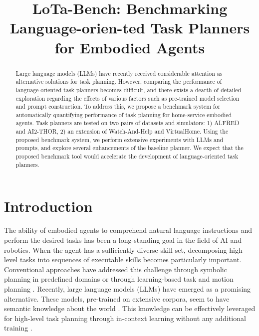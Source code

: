 \title{LoTa-Bench: Benchmarking Language-orien-ted Task Planners for Embodied Agents}



\maketitle
\def\thefootnote{*}\def\thefootnote{\arabic{footnote}}

\begin{abstract}
Large language models (LLMs) have recently received considerable attention as alternative solutions for task planning. However, comparing the performance of language-oriented task planners becomes difficult, and there exists a dearth of detailed exploration regarding the effects of various factors such as pre-trained model selection and prompt construction. To address this, we propose a benchmark system for automatically quantifying performance of task planning for home-service embodied agents. Task planners are tested on two pairs of datasets and simulators: 1) ALFRED and AI2-THOR, 2) an extension of Watch-And-Help and VirtualHome. Using the proposed benchmark system, we perform extensive experiments with LLMs and prompts, and explore several enhancements of the baseline planner. We expect that the proposed benchmark tool would accelerate the development of language-oriented task planners.
\end{abstract}

\section{Introduction}
\label{sec:introduction}
The ability of embodied agents to comprehend natural language instructions and perform the desired tasks has been a long-standing goal in the field of AI and robotics. When the agent has a sufficiently diverse skill set, decomposing high-level tasks into sequences of executable skills becomes particularly important. Conventional approaches have addressed this challenge through symbolic planning in predefined domains \citep{fikes1971strips, garrett2020pddlstream} or through learning-based task and motion planning \citep{silver2023learning, shah2022value, li2022pre}. Recently, large language models (LLMs) have emerged as a promising alternative. These models, pre-trained on extensive corpora, seem to have semantic knowledge about the world \citep{brown2020language, chowdhery2022palm, thoppilan2022lamda, zhang2022opt}. This knowledge can be effectively leveraged for high-level task planning through in-context learning without any additional training \citep{huang2022language, singh2023progprompt, liang2023code, ahn2023do, huang2023inner, yao2023react}.

